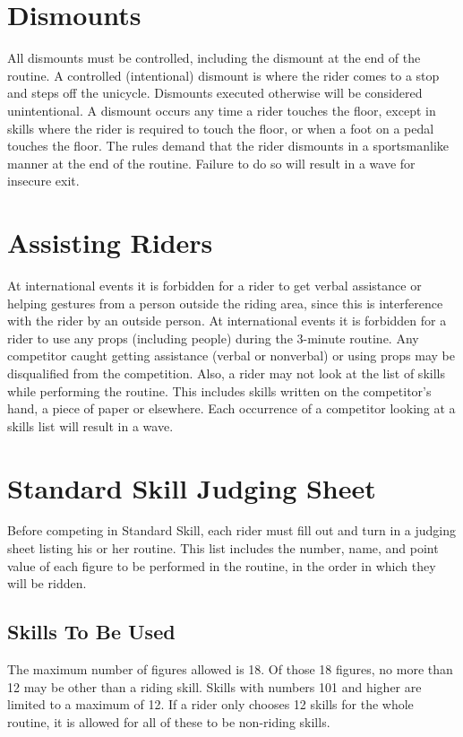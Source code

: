 \section{Dismounts}
All dismounts must be controlled, including the dismount at the end of the routine.
A controlled (intentional) dismount is where the rider comes to a stop and steps off the unicycle.
Dismounts executed otherwise will be considered unintentional.
A dismount occurs any time a rider touches the floor, except in skills where the rider is required to touch the floor, or when a foot on a pedal touches the floor.
The rules demand that the rider dismounts in a sportsmanlike manner at the end of the routine.
Failure to do so will result in a wave for insecure exit.

\section{Assisting Riders}
At international events it is forbidden for a rider to get verbal assistance or helping gestures from a person outside the riding area, since this is interference with the rider by an outside person.
At international events it is forbidden for a rider to use any props (including people) during the 3-minute routine.
Any competitor caught getting assistance (verbal or nonverbal) or using props may be disqualified from the competition.
Also, a rider may not look at the list of skills while performing the routine.
This includes skills written on the competitor's hand, a piece of paper or elsewhere.
Each occurrence of a competitor looking at a skills list will result in a wave.

\section{Standard Skill Judging Sheet}
Before competing in Standard Skill, each rider must fill out and turn in a judging sheet listing his or her routine.
This list includes the number, name, and point value of each figure to be performed in the routine, in the order in which they will be ridden.

\subsection{Skills To Be Used}
The maximum number of figures allowed is 18.
Of those 18 figures, no more than 12 may be other than a riding skill.
Skills with numbers 101 and higher are limited to a maximum of 12.
If a rider only chooses 12 skills for the whole routine, it is allowed for all of these to be non-riding skills.

